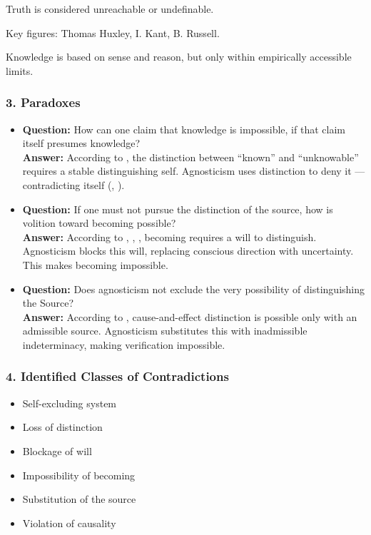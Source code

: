 \documentclass[12pt]{article}
\begin{document}
Truth is considered unreachable or undefinable.

Key figures: Thomas Huxley, I. Kant, B. Russell.

Knowledge is based on sense and reason, but only within empirically accessible limits.

\subsubsection*{3. Paradoxes}

\begin{itemize}
\item \textbf{Question:} How can one claim that knowledge is impossible, if that claim itself presumes knowledge?  
\\ \textbf{Answer:} According to \text{[9]}, the distinction between ``known'' and ``unknowable'' requires a stable distinguishing self. Agnosticism uses distinction to deny it — contradicting itself (\text{[11.1.1]}, \text{[11.2]}).

\item \textbf{Question:} If one must not pursue the distinction of the source, how is volition toward becoming possible?  
\\ \textbf{Answer:} According to \text{[10.5]}, \text{[11.8]}, \text{[7]}, becoming requires a will to distinguish. Agnosticism blocks this will, replacing conscious direction with uncertainty. This makes becoming impossible.

\item \textbf{Question:} Does agnosticism not exclude the very possibility of distinguishing the Source?  
\\ \textbf{Answer:} According to \text{[6]}, cause-and-effect distinction is possible only with an admissible source. Agnosticism substitutes this with inadmissible indeterminacy, making verification impossible.
\end{itemize}

\subsubsection*{4. Identified Classes of Contradictions}

\begin{itemize}
\item Self-excluding system
\item Loss of distinction
\item Blockage of will
\item Impossibility of becoming
\item Substitution of the source
\item Violation of causality
\end{itemize}
\end{document}
